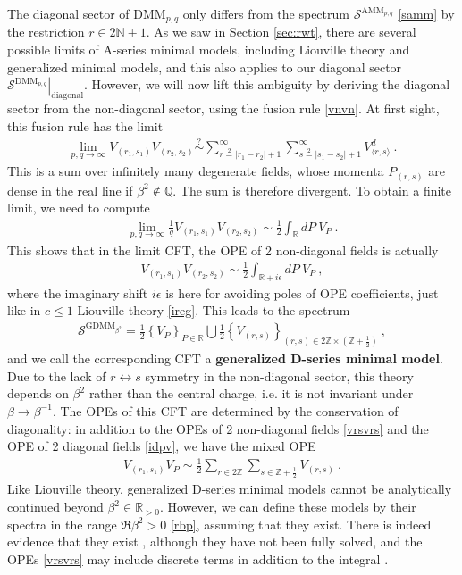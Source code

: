 \documentclass[12pt, a4paper]{article}
\newcommand{\myindex}[1]{\textbf{\boldmath #1}}
\begin{document}
The diagonal sector of $\text{DMM}_{p,q}$ only differs from the spectrum $\mathcal{S}^{\text{AMM}_{p,q}}$ \eqref{samm} by the restriction $r\in 2\mathbb{N}+1$.
As we saw in Section \ref{sec:rwt}, there are several possible limits of A-series minimal models, including Liouville theory and generalized minimal models, and this also applies to our diagonal sector $\left. \mathcal{S}^{\text{DMM}_{p,q}} \right|_{\text{diagonal}} $. However, we will now lift this ambiguity by deriving the diagonal sector from the non-diagonal sector, using the fusion rule \eqref{vnvn}. At first sight, this fusion rule has the limit  
\begin{align}
 \lim_{p,q\to\infty} V_{(r_1,s_1)} V_{(r_2,s_2)}  \overset{?}{\sim} \sum_{r\overset{2}{=}|r_1-r_2|+1}^{\infty} \sum_{s\overset{2}{=}|s_1-s_2|+1}^{\infty} V^d_{\langle r,s\rangle}\ .
\end{align}
This is a sum over infinitely many degenerate fields, whose momenta $P_{(r,s)}$ are dense in the real line if $\beta^2\notin \mathbb{Q}$. The sum is therefore divergent. To obtain a finite limit, we need to compute
\begin{align}
 \lim_{p,q\to\infty} \frac{1}{q} V_{(r_1,s_1)} V_{(r_2,s_2)} \sim \frac12 \int_\mathbb{R} dP \ V_P\ .
\end{align}
This shows that in the limit CFT, the OPE of 2 non-diagonal fields is actually 
\begin{align}
 V_{(r_1,s_1)}V_{(r_2,s_2)} \sim \frac12 \int_{\mathbb{R}+i\epsilon} dP\ V_P\ ,
 \label{vrsvrs}
\end{align}
where the imaginary shift $i\epsilon$ is here for avoiding poles of OPE coefficients, just like in $c\leq 1$ Liouville theory \eqref{ireg}. This leads to the spectrum
\begin{align}
\boxed{\mathcal{S}^{\text{GDMM}_{\beta^2}} = \frac12 \left\{V_P\right\}_{P\in \mathbb{R}} \bigcup  \frac12\left\{V_{(r,s)} \right\}_{ (r,s)\in 2\mathbb{Z}\times (\mathbb{Z}+\frac12)}  }\ ,
\end{align}
and we call the corresponding CFT a \myindex{generalized D-series minimal model}. Due to the lack of $r\leftrightarrow s$ symmetry in the non-diagonal sector, this theory depends on $\beta^2$ rather than the central charge, i.e. it is not invariant under $\beta \to \beta^{-1}$. 
The OPEs of this CFT are determined by the conservation of diagonality: in addition to the OPEs of 2 non-diagonal fields \eqref{vrsvrs} and the OPE of 2 diagonal fields \eqref{idpv}, we have the mixed OPE 
\begin{align}
 V_{(r_1,s_1)}V_P \sim \frac12 \sum_{r\in 2\mathbb{Z}}\sum_{s\in \mathbb{Z}+\frac12} V_{(r,s)} \ . 
\end{align}
Like Liouville theory, generalized D-series minimal models cannot be analytically continued beyond $\beta^2\in \mathbb{R}_{>0}$. However, we can define these models by their spectra in the range $\Re\beta^2>0$ \eqref{rbp}, assuming that they exist. There is indeed evidence that they exist \cite{mr17}, although they have not been fully solved, and the OPEs \eqref{vrsvrs} may include discrete terms in addition to the integral \cite{rib19}.
\end{document}
